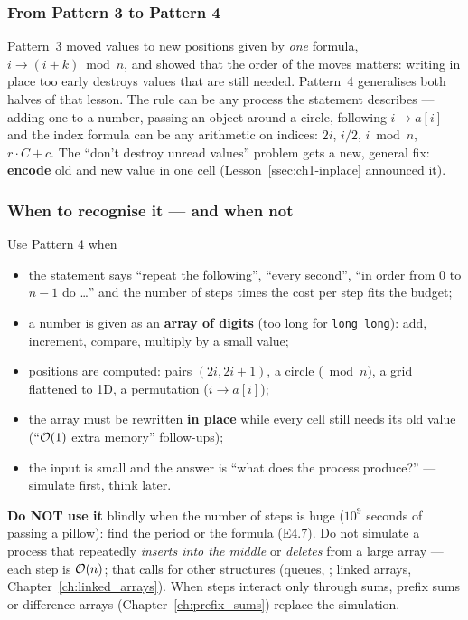 \subsubsection*{From Pattern 3 to Pattern 4}

Pattern~3 moved values to new positions given by \emph{one} formula, $i \to (i+k) \bmod n$, and showed that the order of the moves matters: writing in place too early destroys values that are still needed. Pattern~4 generalises both halves of that lesson. The rule can be any process the statement describes --- adding one to a number, passing an object around a circle, following $i \to a[i]$ --- and the index formula can be any arithmetic on indices: $2i$, $i/2$, $i \bmod n$, $r \cdot C + c$. The ``don't destroy unread values'' problem gets a new, general fix: \textbf{encode} old and new value in one cell (Lesson~\ref{ssec:ch1-inplace} announced it).

\subsubsection*{When to recognise it --- and when not}

Use Pattern 4 when
\begin{itemize}[leftmargin=*]
    \item the statement says ``repeat the following'', ``every second'', ``in order from $0$ to $n-1$ do \ldots'' and the number of steps times the cost per step fits the budget;
    \item a number is given as an \textbf{array of digits} (too long for \texttt{long long}): add, increment, compare, multiply by a small value;
    \item positions are computed: pairs $(2i, 2i+1)$, a circle ($\bmod n$), a grid flattened to 1D, a permutation ($i \to a[i]$);
    \item the array must be rewritten \textbf{in place} while every cell still needs its old value (``$\mathcal{O}(1)$ extra memory'' follow-ups);
    \item the input is small and the answer is ``what does the process produce?'' --- simulate first, think later.
\end{itemize}

\textbf{Do NOT use it} blindly when the number of steps is huge ($10^{9}$ seconds of passing a pillow): find the period or the formula (E4.7). Do not simulate a process that repeatedly \emph{inserts into the middle} or \emph{deletes} from a large array --- each step is $\mathcal{O}(n)$; that calls for other structures (queues, ; linked arrays, Chapter~\ref{ch:linked_arrays}). When steps interact only through sums, prefix sums or difference arrays (Chapter~\ref{ch:prefix_sums}) replace the simulation.

